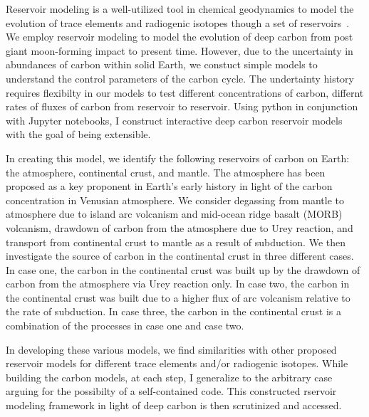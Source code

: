 Reservoir modeling is a well-utilized tool in chemical geodynamics to model the evolution of trace elements and radiogenic isotopes though a set of reservoirs~\cite{ACJ-BO-DB:1980, KLH-WGJ:1990, SNH-ZK:2001}. We employ reservoir modeling to model the evolution of deep carbon from post giant moon-forming impact to present time. However, due to the uncertainty in abundances of carbon within solid Earth, we constuct simple models to understand the control parameters of the carbon cycle. The undertainty history requires flexibilty in our models to test different concentrations of carbon, differnt rates of fluxes of carbon from reservoir to reservoir. Using python in conjunction with Jupyter notebooks, I construct interactive deep carbon reservoir models with the goal of being extensible. 

In creating this model, we identify the following reservoirs of carbon on Earth: the atmosphere, continental crust, and mantle. The atmosphere has been proposed as a key proponent in Earth's early history in light of the carbon concentration in Venusian atmosphere. We consider degassing from mantle to atmosphere due to island arc volcanism and mid-ocean ridge basalt (MORB) volcanism, drawdown of carbon from the atmosphere due to Urey reaction, and transport from continental crust to mantle as a result of subduction. We then investigate the source of carbon in the continental crust in three different cases. In case one, the carbon in the continental crust was built up by the drawdown of carbon from the atmosphere via Urey reaction only. In case two, the carbon in the continental crust was built due to a higher flux of arc volcanism relative to the rate of subduction. In case three, the carbon in the continental crust is a combination of the processes in case one and case two.

In developing these various models, we find similarities with other proposed reservoir models for different trace elements and/or radiogenic isotopes. While building the carbon models, at each step, I generalize to the arbitrary case arguing for the possibilty of a self-contained code. This constructed rservoir modeling framework in light of deep carbon is then scrutinized and accessed.
